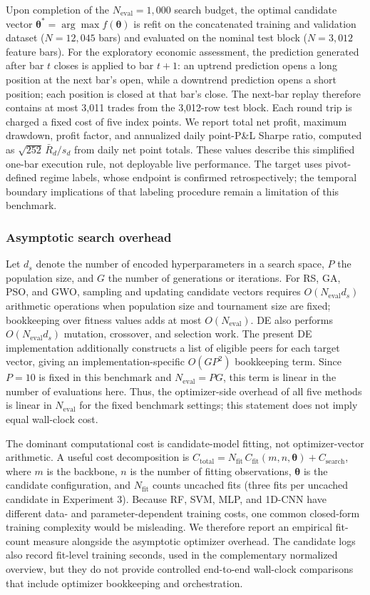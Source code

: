 Upon completion of the $N_{\mathrm{eval}} = 1{,}000$ search budget, the optimal candidate vector $\boldsymbol{\theta}^* = \arg\max f(\boldsymbol{\theta})$ is refit on the concatenated training and validation dataset ($N = 12{,}045$ bars) and evaluated on the nominal test block ($N = 3{,}012$ feature bars). For the exploratory economic assessment, the prediction generated after bar $t$ closes is applied to bar $t+1$: an uptrend prediction opens a long position at the next bar's open, while a downtrend prediction opens a short position; each position is closed at that bar's close. The next-bar replay therefore contains at most 3,011 trades from the 3,012-row test block. Each round trip is charged a fixed cost of five index points. We report total net profit, maximum drawdown, profit factor, and annualized daily point-P\&L Sharpe ratio, computed as $\sqrt{252}\,\bar{R}_{d}/s_{d}$ from daily net point totals. These values describe this simplified one-bar execution rule, not deployable live performance. The target uses pivot-defined regime labels, whose endpoint is confirmed retrospectively; the temporal boundary implications of that labeling procedure remain a limitation of this benchmark.

\subsubsection{Asymptotic search overhead}
Let $d_s$ denote the number of encoded hyperparameters in a search space, $P$ the population size, and $G$ the number of generations or iterations. For RS, GA, PSO, and GWO, sampling and updating candidate vectors requires $O(N_{\mathrm{eval}}d_s)$ arithmetic operations when population size and tournament size are fixed; bookkeeping over fitness values adds at most $O(N_{\mathrm{eval}})$. DE also performs $O(N_{\mathrm{eval}}d_s)$ mutation, crossover, and selection work. The present DE implementation additionally constructs a list of eligible peers for each target vector, giving an implementation-specific $O(GP^2)$ bookkeeping term. Since $P=10$ is fixed in this benchmark and $N_{\mathrm{eval}}=PG$, this term is linear in the number of evaluations here. Thus, the optimizer-side overhead of all five methods is linear in $N_{\mathrm{eval}}$ for the fixed benchmark settings; this statement does not imply equal wall-clock cost.

The dominant computational cost is candidate-model fitting, not optimizer-vector arithmetic. A useful cost decomposition is $C_{\mathrm{total}}=N_{\mathrm{fit}}\,C_{\mathrm{fit}}(m,n,\boldsymbol{\theta})+C_{\mathrm{search}}$, where $m$ is the backbone, $n$ is the number of fitting observations, $\boldsymbol{\theta}$ is the candidate configuration, and $N_{\mathrm{fit}}$ counts uncached fits (three fits per uncached candidate in Experiment 3). Because RF, SVM, MLP, and 1D-CNN have different data- and parameter-dependent training costs, one common closed-form training complexity would be misleading. We therefore report an empirical fit-count measure alongside the asymptotic optimizer overhead. The candidate logs also record fit-level training seconds, used in the complementary normalized overview, but they do not provide controlled end-to-end wall-clock comparisons that include optimizer bookkeeping and orchestration.
